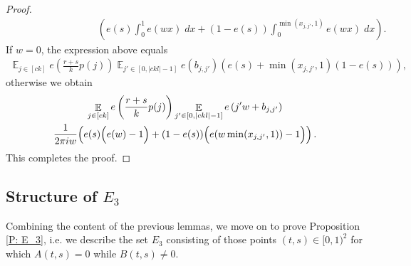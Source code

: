 \documentclass[11pt]{amsart}
\theoremstyle{definition}
\DeclareMathOperator*{\E}{\mathbb{E}}
\newcommand{\1}{{\mathbf{1}}}
\newcommand{\brac}[1]{\mathopen{}\left( #1 \mathclose{}\right)}
\newcommand{\Bigbrac}[1]{\Bigl( #1 \Bigr)}
\begin{document}
\begin{proof}
\begin{align*}
    &\qquad\qquad\qquad\qquad\left(e(s)\int_{0}^1 e\left({w}x\right)\; dx+(1-e(s))\int_{0}^{\min(x_{j,j'},1)} e\left({w}x\right)\; dx\right).
\end{align*}
If $w=0$, the expression above equals
\begin{align*}
    \E_{j\in[ck]}e\left(\frac{{r+s}}{k}p(j)\right)\E_{j'\in[0, |ckl|-1]}e\left(b_{j,j'}\right)(e(s) + \min(x_{j,j'},1)(1-e(s))),
\end{align*}
otherwise we obtain
\begin{multline*}
    \E_{j\in[ck]}e\left(\frac{{r+s}}{k}p(j)\right)\E_{j'\in[0, |ckl|-1]}e\left({j'w}+b_{j,j'}\right)\\
    \frac{1}{2\pi i  {w}}\brac{e(s)\Bigbrac{e({w})-1}+(1-e(s))\Bigbrac{e({w\min(x_{j,j'},1)})-1}}.
\end{multline*}
This completes the proof.
\end{proof}

\subsection{Structure of $E_3$}


Combining the content of the previous lemmas, we move on to prove Proposition \ref{P: E_3}, i.e. we describe the set $E_3$ consisting of those points $(t,s)\in[0,1)^2$ for which $A(t,s) =0$ while $B(t,s)\neq 0$. 
\end{document}
